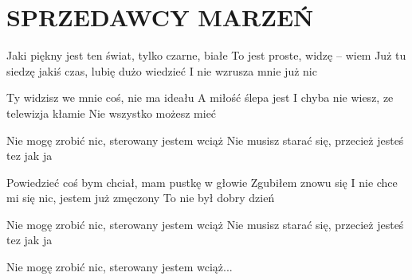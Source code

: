 \documentclass[../../../songbook.tex]{subfiles}
\begin{document}
\TabPositions{9cm} %
\section*{SPRZEDAWCY MARZEŃ}
{}
\vspace{0.5cm}
Jaki piękny jest ten świat, tylko czarne, białe 	 \newline	
To jest proste, widzę – wiem 						  \newline	
Już tu siedzę jakiś czas, lubię dużo wiedzieć \newline
I nie wzrusza mnie już nic \newline

Ty widzisz we mnie coś, nie ma ideału \newline
A miłość ślepa jest \newline
I chyba nie wiesz, ze telewizja kłamie \newline
Nie wszystko możesz mieć \newline

\-\hspace{1cm} Nie mogę zrobić nic, sterowany jestem wciąż	  \newline	
\-\hspace{1cm} Nie musisz starać się, przecież jesteś tez jak ja \newline

Powiedzieć coś bym chciał, mam pustkę w głowie \newline
Zgubiłem znowu się \newline
I nie chce mi się nic, jestem już zmęczony \newline
To nie był dobry dzień \newline

\-\hspace{1cm} Nie mogę zrobić nic, sterowany jestem wciąż \newline
\-\hspace{1cm} Nie musisz starać się, przecież jesteś tez jak ja \newline

\-\hspace{1cm} Nie mogę zrobić nic, sterowany jestem wciąż... \newline
\end{document}
